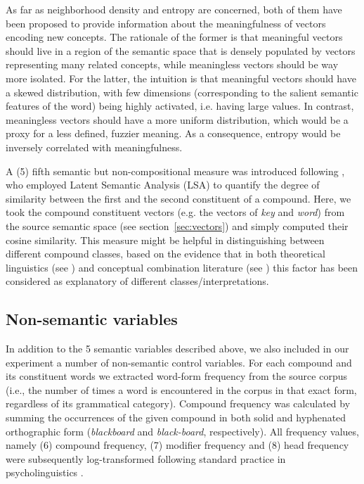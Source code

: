 \documentclass[output=paper]{langsci/langscibook}
\begin{document}
As far as neighborhood density and entropy are concerned, both of them have been proposed to provide information about the meaningfulness of vectors encoding new concepts. The rationale of the former is that meaningful vectors should live in a region of the semantic space that is densely populated by vectors representing many related concepts, while meaningless vectors should be way more isolated. For the latter, the intuition is that meaningful vectors should have a skewed distribution, with few dimensions (corresponding to the salient semantic features of the word) being highly activated, i.e. having large values. In contrast, meaningless vectors should have a more uniform distribution, which would be a proxy for a less defined, fuzzier meaning. As a consequence, entropy would be inversely correlated with meaningfulness.

A (5) fifth semantic but non-compositional measure was introduced following \cite{lynott2001}, who employed Latent Semantic Analysis (LSA) to quantify the degree of similarity between the first and the second constituent of a compound. Here, we took the compound constituent vectors (e.g. the vectors of \emph{key} and \emph{word}) from the source semantic space (see section~\ref{sec:vectors}) and simply computed their cosine similarity. This measure might be helpful in distinguishing between different compound classes, based on the evidence that in both theoretical linguistics (see \citealt{lieber5OHC}) and conceptual combination literature (see \citealt{wisniewski1996}) this factor has been considered as explanatory of different classes/interpretations.

\subsection{Non-semantic variables}

In addition to the 5 semantic variables described above, we also included in our experiment a number of non-semantic control variables. For each compound and its constituent words we extracted word-form frequency from the source corpus (i.e., the number of times a word is encountered in the corpus in that exact form, regardless of its grammatical category). Compound frequency was calculated by summing the occurrences of the given compound in both solid and hyphenated orthographic form (\emph{blackboard} and \emph{black-board}, respectively). All frequency values, namely (6) compound frequency, (7) modifier frequency and (8) head frequency were subsequently log-transformed following standard practice in psycholinguistics \citep{brysbaert2018}.
\end{document}
